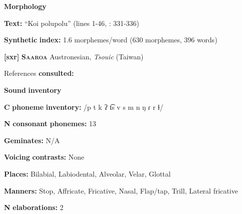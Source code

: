 \documentclass[output=paper]{langsci/langscibook}
\begin{document}
\begin{styleBody}
\textbf{Morphology}
\end{styleBody}

\begin{styleBody}
\textbf{Text:} “Koi polupolu” (lines 1-46, \citealt{Wegener2008}: 331-336)
\end{styleBody}

\begin{styleBody}
\textbf{Synthetic} \textbf{index:} 1.6 morphemes/word (630 morphemes, 396 words)
\end{styleBody}

\begin{styleBody}
\textbf{[sxr]}   \textbf{\textsc{Saaroa}  }  Austronesian, \textit{Tsouic} (Taiwan)
\end{styleBody}

\begin{styleBody}
References \textbf{consulted:} \citet{Pan2012}
\end{styleBody}

\begin{styleBody}
\textbf{Sound} \textbf{inventory}
\end{styleBody}

\begin{styleBody}
\textbf{C} \textbf{phoneme} \textbf{inventory:} /p t k ʔ t͡s v s m n ŋ ɾ r ɬ/
\end{styleBody}

\begin{styleBody}
\textbf{N} \textbf{consonant} \textbf{phonemes:} 13
\end{styleBody}

\begin{styleBody}
\textbf{Geminates:} N/A
\end{styleBody}

\begin{styleBody}
\textbf{Voicing} \textbf{contrasts:} None
\end{styleBody}

\begin{styleBody}
\textbf{Places:} Bilabial, Labiodental, Alveolar, Velar, Glottal
\end{styleBody}

\begin{styleBody}
\textbf{Manners:} Stop, Affricate, Fricative, Nasal, Flap/tap, Trill, Lateral fricative
\end{styleBody}

\begin{styleBody}
\textbf{N} \textbf{elaborations:} 2
\end{styleBody}
\end{document}
